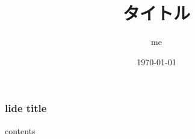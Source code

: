 \documentclass[unicode,aspectratio=169,12pt,xcolor=dvipsnames]{beamer}%
\title{タイトル} %
\author{me} %
\date{\today} %
\begin{document}
\titlepage

\begin{frame}[fragile]
  \frametitle{lide title }
  contents
\end{frame}
\end{document}
